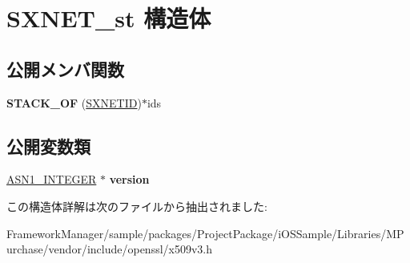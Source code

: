 \hypertarget{struct_s_x_n_e_t__st}{}\section{S\+X\+N\+E\+T\+\_\+st 構造体}
\label{struct_s_x_n_e_t__st}
\subsection*{公開メンバ関数}
\begin{DoxyCompactItemize}
\item 
\hypertarget{struct_s_x_n_e_t__st_a8471b75a1f89aa7250dcd73ca5df3981}{}{\bfseries S\+T\+A\+C\+K\+\_\+\+O\+F} (\hyperlink{struct_s_x_n_e_t___i_d__st}{S\+X\+N\+E\+T\+I\+D})$\ast$ids\label{struct_s_x_n_e_t__st_a8471b75a1f89aa7250dcd73ca5df3981}

\end{DoxyCompactItemize}
\subsection*{公開変数類}
\begin{DoxyCompactItemize}
\item 
\hypertarget{struct_s_x_n_e_t__st_ac542b59573e2c64e51f9bdfb49144526}{}\hyperlink{structasn1__string__st}{A\+S\+N1\+\_\+\+I\+N\+T\+E\+G\+E\+R} $\ast$ {\bfseries version}\label{struct_s_x_n_e_t__st_ac542b59573e2c64e51f9bdfb49144526}

\end{DoxyCompactItemize}


この構造体詳解は次のファイルから抽出されました\+:\begin{DoxyCompactItemize}
\item 
Framework\+Manager/sample/packages/\+Project\+Package/i\+O\+S\+Sample/\+Libraries/\+M\+Purchase/vendor/include/openssl/x509v3.\+h\end{DoxyCompactItemize}

